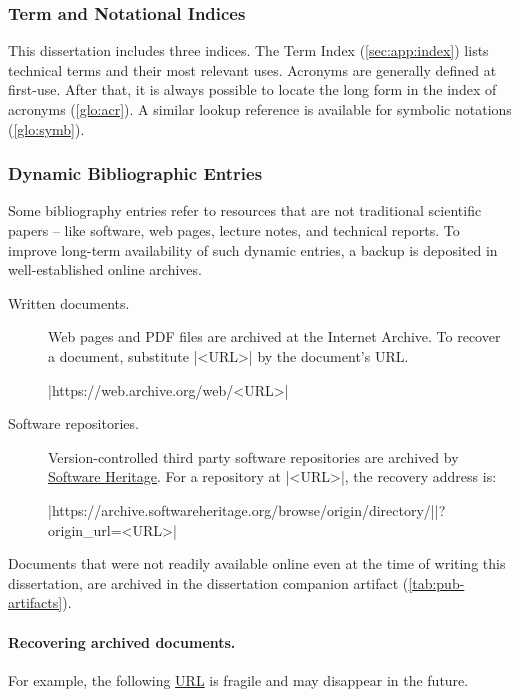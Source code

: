 \subsubsection{Term and Notational Indices}

This dissertation includes three indices.
The Term Index (\autoref{sec:app:index}) lists technical terms and their most relevant uses.
Acronyms are generally defined at first-use.
After that, it is always possible to locate the long form in the index of acronyms (\autoref{glo:acr}).
A similar lookup reference is available for symbolic notations (\autoref{glo:symb}).

\subsubsection{Dynamic Bibliographic Entries}

Some bibliography entries refer to resources that are not traditional scientific papers --
like software, web pages, lecture notes, and technical reports.
To improve long-term availability of such dynamic entries, a backup is deposited in well-established online archives.

\begin{description}
\item[Written documents.]
Web pages and PDF files are archived at the Internet Archive.
To recover a document, substitute \pr|<URL>| by the document's URL.
\begin{center}\pr|https://web.archive.org/web/<URL>|\end{center}

\item[Software repositories.]
Version-controlled third party software repositories are archived by \href{https://softwareheritage.org/}{Software Heritage}.
For a repository at \pr|<URL>|, the recovery address is:%
\begin{center}\pr|https://archive.softwareheritage.org/browse/origin/directory/|\mbox{\pr|?origin_url=<URL>|}\end{center}
\end{description}

Documents that were not readily available online even at the time of writing this dissertation, are archived in the dissertation companion artifact (\autoref{tab:pub-artifacts}).

\paragraph*{Recovering archived documents.}
For example, the following \href{https://types22.inria.fr/files/2022/06/TYPES_2022_paper_14.pdf}{URL} is fragile and may disappear in the future.

